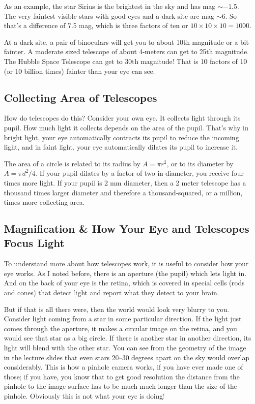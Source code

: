 \documentclass[12pt, preprint]{aastex}
\begin{document}
As an example, the star Sirius is the brightest in the sky and has
mag $\sim -1.5$. The very faintest visible stars with good eyes and a
dark site are mag $\sim 6$. So that's a difference of 7.5 mag, which
is three factors of ten or $10\times10\times 10= 1000$.

At a dark site, a pair of binoculars will get you to about 10th
magnitude or a bit fainter. A moderate sized telescope of about
4-meters can get to 25th magnitude. The Hubble Space Telescope can get
to 30th magnitude! That is 10 factors of 10 (or 10 billion times)
fainter than your eye can see.

\subsection{Collecting Area of Telescopes}

How do telescopes do this? Consider your own eye. It collects light
through its pupil. How much light it collects depends on the area of
the pupil. That's why in bright light, your eye automatically
contracts its pupil to reduce the incoming light, and in faint light,
your eye automatically dilates its pupil to increase it.

The area of a circle is related to its radius by $A=\pi r^2$, or to
its diameter by $A=\pi d^2/4$. If your pupil dilates by a factor of
two in diameter, you receive four times more light. If your pupil is 2
mm diameter, then a 2 meter telescope has a thousand times larger
diameter and therefore a thousand-squared, or a million, times more
collecting area.

\subsection{Magnification \& How Your Eye and Telescopes Focus Light}

To understand more about how telescopes work, it is useful to consider
how your eye works. As I noted before, there is an aperture (the
pupil) which lets light in. And on the back of your eye is the retina,
which is covered in special cells (rods and cones) that detect light
and report what they detect to your brain.

But if that is all there were, then the world would look very blurry
to you. Consider light coming from a star in some particular
direction. If the light just comes through the aperture, it makes a
circular image on the retina, and you would see that star as a big
circle. If there is another star in another direction, its light will
blend with the other star. You can see from the geometry of the image
in the lecture slides that even stars 20--30 degrees apart on the sky
would overlap considerably. This is how a pinhole camera works, if you
have ever made one of those; if you have, you know that to get good
resolution the distance from the pinhole to the image surface has to
be much much longer than the size of the pinhole. Obviously this is
not what your eye is doing!
\end{document}
